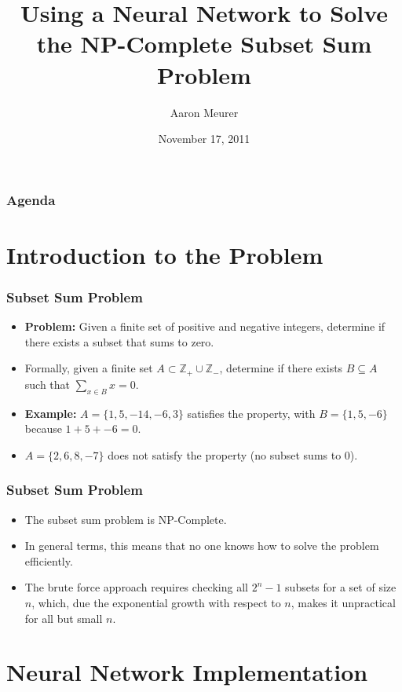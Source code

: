 \documentclass{beamer}
\title{Using a Neural Network to Solve the NP-Complete Subset Sum Problem}
\author{Aaron Meurer}
\date{November 17, 2011}
\numberwithin{equation}{section} %
\begin{document}
\begin{frame}
    \titlepage
\end{frame}

\begin{frame}
    \frametitle{Agenda}
    \tableofcontents
\end{frame}

\section{Introduction to the Problem}

\begin{frame}
    \frametitle{Subset Sum Problem}
    \begin{itemize}
        \item \textbf{Problem:} Given a finite set of positive and negative integers, determine if there exists a subset that sums to zero.
        \pause
        \item Formally, given a finite set $A \subset \mathbb{Z}_+ \cup \mathbb{Z}_-$, determine if there exists $B \subseteq A$ such that $\sum_{x\in B}x = 0$.
        \pause
       \item \textbf{Example:} $A=\{1, 5, -14, -6, 3\}$ satisfies the property, with $B=\{1, 5, -6\}$ because $1 + 5 + -6 = 0$.
       \pause
       \item $A=\{2, 6, 8, -7\}$ does not satisfy the property (no subset sums to 0).
    \end{itemize}
\end{frame}

\begin{frame}
    \frametitle{Subset Sum Problem}
    \begin{itemize}
        \item The subset sum problem is NP-Complete.
        \pause
        \item In general terms, this means that no one knows how to solve the problem efficiently.
        \pause
        \item The brute force approach requires checking all $2^n - 1$ subsets for a set of size $n$, which, due the exponential growth with respect to $n$, makes it unpractical for all but small $n$.
    \end{itemize}
\end{frame}

\section{Neural Network Implementation}
\end{document}
